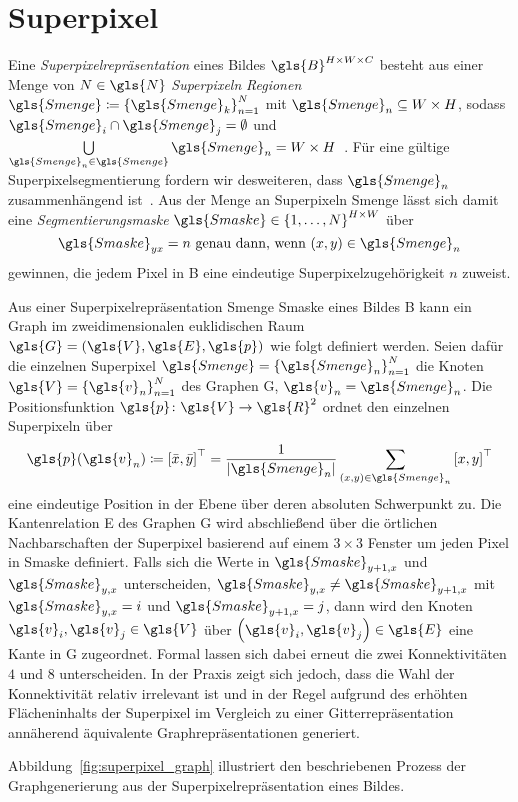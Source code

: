 \section{Superpixel}
\label{superpixel}


Eine \emph{Superpixelrepräsentation} eines Bildes $\gls{B}^{H \times W \times C}$ besteht aus einer Menge von $N \in \gls{N}$ \emph{Superpixeln} \bzw{} \emph{Regionen} $\gls{Smenge} \coloneqq {\left\{\gls{Smenge}_k\right\}}_{n=1}^N$ mit $\gls{Smenge}_n \subseteq W \times H$, sodass $\gls{Smenge}_i \cap \gls{Smenge}_j = \emptyset$ und $\bigcup\limits_{\gls{Smenge}_n \in \gls{Smenge}} \gls{Smenge}_n = W \times H$~\cite{super}.
Für eine gültige Superpixelsegmentierung fordern wir desweiteren, dass $\gls{Smenge}_n$ zusammenhängend ist~\cite{super}.
Aus der Menge an Superpixeln \gls{Smenge} lässt sich damit eine \emph{Segmentierungsmaske} $\gls{Smaske} \in {\left\{1, \ldots, N\right\}}^{H \times W}$ über
\begin{equation*}
  \gls{Smaske}_{yx} = n\,\, \text{\gdw{} } \left(x,y\right) \in \gls{Smenge}_n
\end{equation*}
gewinnen, die jedem Pixel in \gls{B} eine eindeutige Superpixelzugehörigkeit $n$ zuweist.

Aus einer Superpixelrepräsentation \gls{Smenge} \bzw{} \gls{Smaske} eines Bildes \gls{B} kann ein Graph im zweidimensionalen euklidischen Raum $\gls{G}=\left(\gls{V}, \gls{E}, \gls{p}\right)$ wie folgt definiert werden.
Seien dafür die einzelnen Superpixel $\gls{Smenge} = {\left\{\gls{Smenge}_n\right\}}_{n=1}^N$ die Knoten $\gls{V} = {\left\{\gls{v}_n\right\}}_{n=1}^N$ des Graphen \gls{G}, \dhe{} $\gls{v}_n = \gls{Smenge}_n$.
Die Positionsfunktion $\gls{p} \colon \gls{V} \to \gls{R}^2$ ordnet den einzelnen Superpixeln über
\begin{equation*}
  \gls{p}\left(\gls{v}_n\right) \coloneqq {\left[\bar{x}, \bar{y}\right]}^{\top} =  \frac{1}{\left|\gls{Smenge}_n\right|}\sum_{\left(x,y\right) \in \gls{Smenge}_n} {\left[x, y\right]}^{\top}
\end{equation*}
eine eindeutige Position in der Ebene über deren absoluten Schwerpunkt zu.
Die Kantenrelation \gls{E} des Graphen \gls{G} wird abschließend über die örtlichen Nachbarschaften der Superpixel basierend auf einem $3 \times 3$ Fenster um jeden Pixel in \gls{Smaske} definiert.
Falls sich \bspw{} die Werte in $\gls{Smaske}_{y+1,x}$ und $\gls{Smaske}_{y,x}$ unterscheiden,
\dhe{} $\gls{Smaske}_{y,x} \neq \gls{Smaske}_{y+1,x}$ mit $\gls{Smaske}_{y,x} = i$ und $\gls{Smaske}_{y+1,x}=j$, dann wird den Knoten $\gls{v}_i, \gls{v}_j \in \gls{V}$ über $\left(\gls{v}_i, \gls{v}_j\right) \in \gls{E}$ eine Kante in \gls{G} zugeordnet.
Formal lassen sich dabei erneut die zwei Konnektivitäten $4$ und $8$ unterscheiden.
In der Praxis zeigt sich jedoch, dass die Wahl der Konnektivität relativ irrelevant ist und in der Regel aufgrund des erhöhten Flächeninhalts der Superpixel im Vergleich zu einer Gitterrepräsentation annäherend äquivalente Graphrepräsentationen generiert.

Abbildung~\ref{fig:superpixel_graph} illustriert den beschriebenen Prozess der Graphgenerierung aus der Superpixelrepräsentation eines Bildes.

